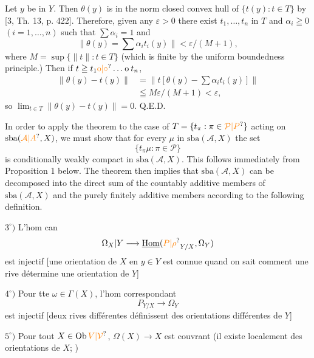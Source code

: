 
Let $y$ be in $Y$. Then $\theta(y)$ is in the norm closed convex hull of $\{t(y):t\in T\}$ by [3, Th. 13, p. 422]. Therefore, given any $\varepsilon>0$ there exist $t_1,\ldots,t_n$ in $T$ and $\alpha_i\geqq 0$ $(i=1,\ldots,n)$ such that $\sum\alpha_i=1$ and
\[
\lVert\theta(y)=\sum\alpha_i t_i(y)\rVert<\varepsilon/(M+1),
\]
where $M=\sup\{\lVert t\rVert:t\in T\}$ (which is finite by the uniform boundedness principle.) Then if $t\geqq t_1\unsure{\mathbin{\mathrm{o}}|\circ}\ldots\mathbin{\mathrm{o}}t_n$,
\[
\begin{aligned}
\lVert\theta(y)-t(y)\rVert&=\lVert t[\theta(y)-\sum\alpha_i t_i(y)]\rVert\\
&\leqq M\varepsilon/(M+1)<\varepsilon,
\end{aligned}
\]
so $\displaystyle\lim_{t\in T}\lVert\theta(y)-t(y)\rVert=0$. \hfill Q.E.D.

In order to apply the theorem to the case of $T=\{t_\pi:\pi\in\unsure{\mathcal{P}|P}\}$ acting on $\mathrm{sba}(\unsure{\mathcal{A}|A},X)$, we must show that for every $\mu$ in $\mathrm{sba}(\mathcal{A},X)$ the set
\[
\{t_\pi\mu:\pi\in\mathcal{P}\}
\]
is conditionally weakly compact in $\mathrm{sba}(\mathcal{A},X)$. This follows immediately from Proposition 1 below. The theorem then implies that $\mathrm{sba}(\mathcal{A},X)$ can be decomposed into the direct sum of the countably additive members of $\mathrm{sba}(\mathcal{A},X)$ and the purely finitely additive members according to the following definition.

$3^\circ)$ L'hom can
\[
\Omega_X|Y\longrightarrow\underline{\mathrm{Hom}}(\unsure{P|\rho}_{Y/X},\Omega_Y)
\]
est injectif [une orientation de $X$ en $y\in Y$ est connue quand on sait comment  une rive  détermine une orientation de $Y$]

$4^\circ)$ Pour tte $\omega\in\Gamma(X)$, l'hom correspondant
\[
P_{Y/X}\longrightarrow\Omega_Y
\]
est injectif [deux rives différentes définissent des orientations différentes de $Y$]

$5^\circ)$ Pour tout $X\in\mathrm{Ob}\,\unsure{V|\mathcal{V}}$, $\Omega(X)\to X$ est couvrant (il existe localement des orientations  de $X$; )

